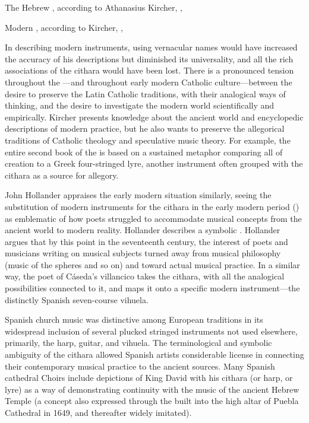 {The Hebrew , according to Athanasius Kircher, , }

{Modern , according to Kircher, ,
}

In describing modern instruments, using vernacular names would have increased
the accuracy of his descriptions but diminished its universality, and all the
rich associations of the cithara would have been lost.
There is a pronounced tension throughout the ---and throughout
early modern Catholic culture---between the desire to preserve the Latin
Catholic traditions, with their analogical ways of thinking, and the desire to
investigate the modern world scientifically and empirically.
Kircher presents  knowledge about the ancient world and
encyclopedic descriptions of modern practice, but he also wants to preserve the
allegorical traditions of Catholic theology and speculative music theory.
For example, the entire second book of the  is based on a
sustained metaphor comparing all of creation to a Greek four-stringed lyre,
another instrument often grouped with the cithara as a source for allegory.

John Hollander appraises the early modern situation similarly, seeing the
substitution of modern instruments for the cithara in the early modern period
() as emblematic of how poets struggled to accommodate
musical concepts from the ancient world to modern reality.
Hollander describes a symbolic .%
    \Autocite[44--51]{Hollander:Untuning}
Hollander argues that by this point in the seventeenth century, the interest of
poets and musicians writing on musical subjects turned away from musical
philosophy (music of the spheres and so on) and toward actual musical practice. 
In a similar way, the poet of Cáseda's villancico takes the cithara, with all
the analogical possibilities connected to it, and maps it onto a specific
modern instrument---the distinctly Spanish seven-course vihuela.

Spanish church music was distinctive among European traditions in its
widespread inclusion of several plucked stringed instruments not used
elsewhere, primarily, the harp, guitar, and vihuela. 
The terminological and symbolic ambiguity of the cithara allowed Spanish
artists considerable license in connecting their contemporary musical practice
to the ancient sources.
Many Spanish cathedral Choirs include depictions of King David with his cithara
(or harp, or lyre) as a way of demonstrating continuity with the music of the
ancient Hebrew Temple (a concept also expressed through the  built into the high altar of Puebla Cathedral in 1649, and thereafter
widely imitated). 

